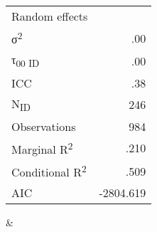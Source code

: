 \documentclass[output=paper,colorlinks,citecolor=brown]{langscibook}
\begin{document}
\begin{sidewaystable}
\begin{tabular}
        \midrule
        \begin{tabular}{@{} l r @{}}
        Random effects\\ 
        σ\textsuperscript{2}                & .00 \\
        τ\textsubscript{00 ID}              & .00 \\
        ICC                                 & .38 \\
        N\textsubscript{ID}                 & 246 \\
        Observations                        & 984 \\
        Marginal R\textsuperscript{2}       & .210  \\
        Conditional R\textsuperscript{2}    & .509 \\
        AIC                                 & -2804.619 \\ 
        \end{tabular} & \\
        \lspbottomrule
    \end{tabular}
    \label{tab:kelleretal:MATTR_final_model_DE}
\end{sidewaystable}
\end{document}
